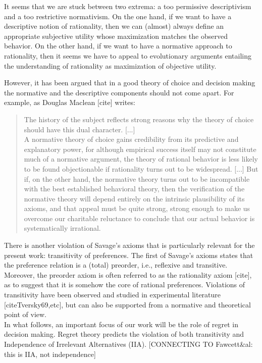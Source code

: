\documentclass[fleqn,reqno,11pt]{article}
\begin{document}
It seems that we are stuck between two extrema: a too permissive descriptivism and a too restrictive normativism. On the one hand, if we want to have a
descriptive notion of rationality, then we can (almost) always define an appropriate
subjective utility whose maximization matches the observed behavior. On the other hand, if we
want to have a normative approach to rationality, then it seems we have to appeal to
evolutionary arguments entailing the understanding of rationality as maximization of objective
utility.

However, it has been argued that in a good theory of choice and decision making the normative and the descriptive components should not come apart. For example, as Douglas Maclean [cite] writes:

\begin{quote}
The history of the subject reflects strong reasons why the theory of choice should have this dual character. [...] \\
A normative theory of choice gains credibility from its predictive and explanatory power, for although empirical success itself may not constitute much of a normative argument, the theory of rational behavior is less likely to be found objectionable if rationality turns out to be widespread. [...] But if, on the other hand, the normative theory turns out to be incompatible with the best established behavioral theory, then the verification of the normative theory will depend entirely on the intrinsic plausibility of its axioms, and that appeal must be quite strong, strong enough to make us overcome our charitable reluctance to conclude that our actual behavior is systematically irrational.
\end{quote}


There is another violation of Savage's axioms that is particularly relevant for the present work: transitivity of preferences. The first of Savage's axioms states that the preference relation is a (total) preorder, i.e., reflexive and transitive. Moreover, the preorder axiom is often referred to as the rationality axiom [cite], as to suggest that it is somehow the core of rational preferences. Violations of transitivity have been observed and studied in experimental literature [citeTversky69,etc], but can also be supported from a normative and theoretical point of view. \\
In what follows, an important focus of our work will be the role of regret in decision making. Regret theory predicts the violation of both transitivity and Independence of Irrelevant Alternatives (IIA). [CONNECTING TO Fawcett\&al: this is IIA, not independence]
\end{document}
